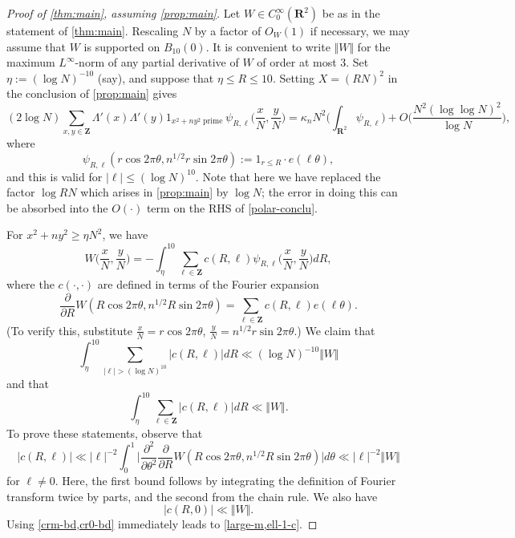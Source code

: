 \documentclass[11pt,reqno]{amsart}
\numberwithin{equation}{section}
\theoremstyle{definition}
\theoremstyle{remark}
\renewcommand{\le}{\leqslant}
\renewcommand{\ge}{\geqslant}
\newcommand\Z{\mathbf{Z}}
\newcommand\R{\mathbf{R}}
\begin{document}
\begin{proof}[Proof of \cref{thm:main}, assuming \cref{prop:main}] 
Let $W \in C_0^{\infty}(\R^2)$ be as in the statement of \cref{thm:main}. Rescaling $N$ by a factor of $O_W(1)$ if necessary, we may assume that $W$ is supported on $B_{10}(0)$. It is convenient to write $\Vert W \Vert$ for the maximum $L^{\infty}$-norm of any partial derivative of $W$ of order at most $3$. Set $\eta := (\log N)^{-10}$ (say), and suppose that $\eta \le R \le 10$. Setting $X = (RN)^2$ in the conclusion of \cref{prop:main} gives
\begin{equation}\label{polar-conclu} 
(2\log N )\sum_{x, y \in \Z} \Lambda'(x) \Lambda'(y) 1_{x^2 + ny^2  \operatorname{prime}} \psi_{R,\ell}\bigg(\frac{x}{N}, \frac{y}{N}\bigg) = \kappa_n N^2 \bigg(\int_{\R^2} \psi_{R,\ell}\bigg) + O\bigg(\frac{N^2(\log\log N)^{2}}{\log N}\bigg),\end{equation}
where 
\[ \psi_{R,\ell} (r \cos 2\pi \theta, n^{1/2}  r \sin 2\pi \theta) := 1_{r \le R} \cdot e(\ell \theta),\] and this is valid for $|\ell| \le (\log N)^{10}$. Note that here we have replaced the factor $\log RN$ which arises in \cref{prop:main} by $\log N$; the error in doing this can be absorbed into the $O( \cdot)$ term on the RHS of \cref{polar-conclu}. 

For $x^2 + ny^2 \ge \eta N^2$, we have
\begin{equation}\label{W-decomp-1} W\bigg(\frac{x}{N}, \frac{y}{N}\bigg) = -\int^{10}_{\eta} \sum_{\ell \in \Z} c(R,\ell) \psi_{R,\ell}\bigg(\frac{x}{N}, \frac{y}{N}\bigg) dR, \end{equation}
where the $c(\cdot, \cdot )$ are defined in terms of the Fourier expansion
\[ \frac{\partial}{\partial R} W(R \cos 2\pi \theta, n^{1/2} R \sin 2\pi \theta) = \sum_{\ell \in \Z} c(R,\ell) e(\ell \theta).\]
(To verify this, substitute $\frac{x}{N} = r \cos 2\pi \theta$, $\frac{y}{N} = n^{1/2} r \sin 2\pi \theta$.)
We claim that 
\begin{equation}\label{large-m} 
\int^{10}_{\eta} \sum_{|\ell| > (\log N)^{10}} |c(R,\ell)| dR \ll (\log N)^{-10} \Vert W \Vert
\end{equation}
and that 
\begin{equation}\label{ell-1-c}
\int^{10}_{\eta} \sum_{\ell \in \Z} |c(R,\ell)| dR \ll  \Vert W \Vert .   
\end{equation}
To prove these statements, observe that
\begin{equation}\label{crm-bd} |c(R,\ell)| \ll |\ell|^{-2}\int^{1}_0 \Big| \frac{\partial^2}{\partial \theta^2}\frac{\partial}{\partial R} W(R \cos 2\pi \theta, n^{1/2} R \sin 2\pi \theta)\Big| d\theta \ll |\ell|^{-2} \Vert  W \Vert \end{equation} for $\ell \neq 0$. Here, the first bound follows by integrating the definition of Fourier transform twice by parts, and the second from the chain rule.
We also have
\begin{equation}\label{cr0-bd} |c(R,0)| \ll \Vert W \Vert .\end{equation}
Using \cref{crm-bd,cr0-bd} immediately leads to \cref{large-m,ell-1-c}.


\end{proof}
\end{document}
